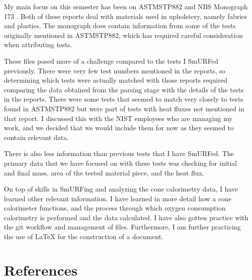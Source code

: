 \documentclass{abstract}
\begin{document}
My main focus on this semester has been on ASTMSTP882 \cite{babrauskas1985upholstery} and NBS Monograph 173 \cite{NBSMonograph173}. Both of these reports deal with materials used in upholstery, namely fabrics and plastics. The monograph does contain information from some of the tests originally mentioned in ASTMSTP882, which has required careful consideration when attributing tests.

These files posed more of a challenge compared to the tests I SmURFed previously. There were very few test numbers mentioned in the reports, so determining which tests were actually matched with those reports required comparing the data obtained from the parsing stage with the details of the tests in the reports. There were some tests that seemed to match very closely to tests found in ASTMSTP882 but were part of tests with heat fluxes not mentioned in that report. I discussed this with the NIST employees who are managing my work, and we decided that we would include them for now as they seemed to contain relevant data.

There is also less information than previous tests that I have SmURFed. The primary data that we have focused on with these tests was checking for initial and final mass, area of the tested material piece, and the heat flux. 

On top of skills in SmURFing and analyzing the cone calorimetry data, I have learned other relevant information. I have learned in more detail how a cone calorimeter functions, and the process through which oxygen consumption calorimetry is performed and the data calculated. I have also gotten practice with the git workflow and management of files. Furthermore, I am further practicing the use of LaTeX for the construction of a document.


\section{References}
\printbibliography[heading=none]
\end{document}
